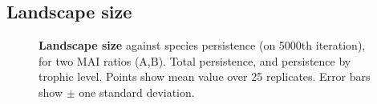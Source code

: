 \clearpage
\subsection{Landscape size}
\label{sec:lsvp}

% 

\begin{figure}
	\centering	
	\setlength{\subfloatlabelskip}{0pt}
	\caption{\textbf{Landscape size} against species persistence (on 5000th iteration), for two MAI ratios (A,B). Total persistence, and persistence by trophic level. Points show mean value over 25 replicates. Error bars show $\pm$ one standard deviation.}
	\label{fig:ls_v_comp}
\end{figure}

